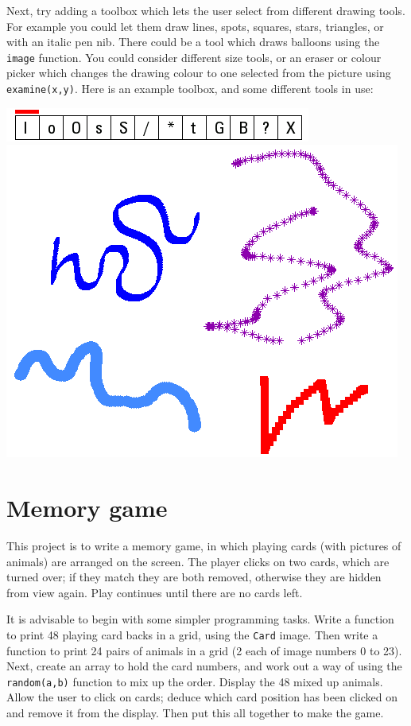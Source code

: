 \documentclass[12pt,a4paper,twoside]{article}
\renewcommand{\_}{\texttt{\symbol{95}}}
\begin{document}
Next, try adding a toolbox which lets the user select from different
drawing tools. For example you could let them draw lines, spots, squares,
stars, triangles, or with an italic pen nib. There could be a tool which
draws balloons using the \verb^image^ function. You could consider
different size tools, or an eraser or colour picker which changes the
drawing colour to one selected from the picture using \verb^examine(x,y)^.
Here is an example toolbox, and some different tools in use:
\begin{center}
\includegraphics[scale=0.6,angle=0]{screenshots/artpixel/paint/toolbox}\\[2mm]
\includegraphics[scale=0.5,angle=0]{screenshots/artpixel/paint/tools}
\end{center}

\newpage
\section{Memory game}

This project is to write a memory game, in which playing cards (with
pictures of animals) are arranged on the screen. The player clicks
on two cards, which are turned over; if they match they are both removed,
otherwise they are hidden from view again. Play continues until there
are no cards left.

It is advisable to begin with some simpler programming tasks.
Write a function to print 48 playing card backs in a grid, using the
\verb^Card^ image. Then write a function to print 24 pairs of animals
in a grid (2 each of image numbers 0 to 23). Next, create an array
to hold the card numbers, and work out a way of using the
\verb^random(a,b)^ function to mix up the order. Display the
48 mixed up animals. Allow the user to click on cards; deduce
which card position has been clicked on and remove it from the
display. Then put this all together to make the game.
\end{document}
